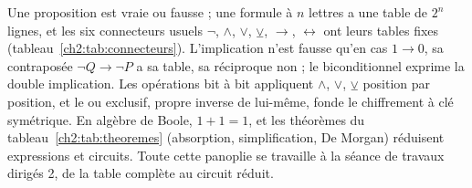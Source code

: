 \begin{aretirer}
Une proposition est vraie ou fausse ; une formule à $n$ lettres a une table de $2^{n}$ lignes, et les six connecteurs usuels $\lnot$, $\land$, $\lor$, $\veebar$, $\rightarrow$, $\leftrightarrow$ ont leurs tables fixes (tableau~\ref{ch2:tab:connecteurs}). L'implication n'est fausse qu'en cas $1 \rightarrow 0$, sa contraposée $\lnot Q \rightarrow \lnot P$ a sa table, sa réciproque non ; le biconditionnel exprime la double implication. Les opérations bit à bit appliquent $\land$, $\lor$, $\veebar$ position par position, et le ou exclusif, propre inverse de lui-même, fonde le chiffrement à clé symétrique. En algèbre de Boole, $1 + 1 = 1$, et les théorèmes du tableau~\ref{ch2:tab:theoremes} (absorption, simplification, De Morgan) réduisent expressions et circuits. Toute cette panoplie se travaille à la séance de travaux dirigés 2, de la table complète au circuit réduit.
\end{aretirer}
